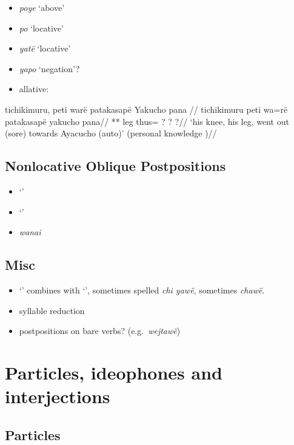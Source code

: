 \documentclass{memoir}
\begin{document}
\begin{itemize}
\item
  \emph{poye} `above'
\item
  \emph{po} `locative'
\item
  \emph{yatë} `locative'
\item
  \emph{yapo} `negation'?
\item
  allative:
\end{itemize}

\ex \label{histpajirdi-186}
\begingl \glpreamble tichikimuru, peti warë patakasapë Yakucho pana //
\gla tichikimuru peti wa=rë patakasapë yakucho pana//
\glb *** leg thus= ? ? ?//
\glft ‘his knee, his leg, went out (sore) towards Ayacucho (auto)’ (personal knowledge
)//
\endgl
\xe

\section{Nonlocative Oblique Postpositions}

\begin{itemize}
\tightlist
\item
   `'
\item
   `'
\item
  \emph{wanai}
\end{itemize}

\section{Misc}

\begin{itemize}
\tightlist
\item
   `' combines with  `', sometimes
  spelled \emph{chi yawë}, sometimes \emph{chawë}.
\item
  syllable reduction
\item
  postpositions on bare verbs? (e.g.~\emph{wejtawë})
\end{itemize}

\chapter{\texorpdfstring{Particles, ideophones and interjections
\label{partideo}}{Particles, ideophones and interjections }}

\section{Particles}
\end{document}
